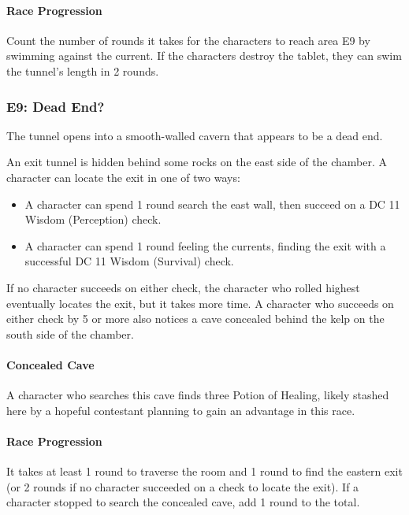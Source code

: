 \documentclass[10pt,a4paper,twoside,bg=print,twocolumn,openany,nodeprecatedcode]{dndbook}
\begin{document}
\paragraph{Race Progression}
Count the number of rounds it takes for the characters to reach area E9 by swimming against the current. If the characters destroy the tablet, they can swim the tunnel's length in 2 rounds.

\subsubsection{E9: Dead End?}
\begin{DndReadAloud}{}
The tunnel opens into a smooth-walled cavern that appears to be a dead end.

\end{DndReadAloud}

An exit tunnel is hidden behind some rocks on the east side of the chamber. A character can locate the exit in one of two ways:


\begin{itemize}
\item A character can spend 1 round search the east wall, then succeed on a DC 11 Wisdom (Perception) check.
\item A character can spend 1 round feeling the currents, finding the exit with a successful DC 11 Wisdom (Survival) check.
\end{itemize}

If no character succeeds on either check, the character who rolled highest eventually locates the exit, but it takes more time. A character who succeeds on either check by 5 or more also notices a cave concealed behind the kelp on the south side of the chamber.

\paragraph{Concealed Cave}
A character who searches this cave finds three Potion of Healing, likely stashed here by a hopeful contestant planning to gain an advantage in this race.

\paragraph{Race Progression}
It takes at least 1 round to traverse the room and 1 round to find the eastern exit (or 2 rounds if no character succeeded on a check to locate the exit). If a character stopped to search the concealed cave, add 1 round to the total.
\end{document}
